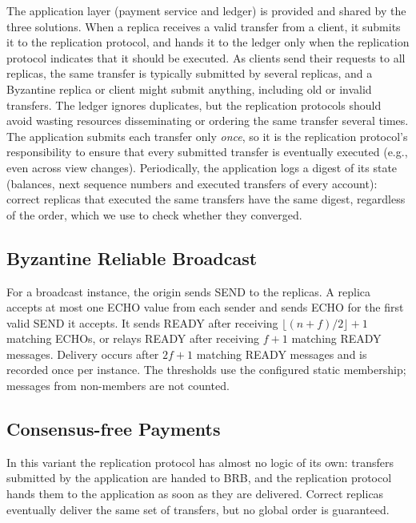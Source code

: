\documentclass[sigconf,a4paper]{acmart}
\begin{document}
    The application layer (payment service and ledger) is provided and shared by
    the three solutions. When a replica receives a valid transfer from a client, it
    submits it to the replication protocol, and hands it to the ledger only when
    the replication protocol indicates that it should be executed. As clients send
    their requests to all replicas, the same transfer is typically submitted by
    several replicas, and a Byzantine replica or client might submit anything,
    including old or invalid transfers. The ledger ignores duplicates, but the
    replication protocols should avoid wasting resources disseminating or ordering
    the same transfer several times. The application submits each transfer only
    \emph{once}, so it is the replication protocol's responsibility to ensure that
    every submitted transfer is eventually executed (e.g., even across view
    changes). Periodically, the application logs a digest of its state (balances,
    next sequence numbers and executed transfers of every account): correct
    replicas that executed the same transfers have the same digest, regardless of
    the order, which we use to check whether they converged.

    \subsection{Byzantine Reliable Broadcast}

    For a broadcast instance, the origin sends SEND to the replicas. A replica
    accepts at most one ECHO value from each sender and sends ECHO for the first
    valid SEND it accepts. It sends READY after receiving
    $\lfloor(n+f)/2\rfloor+1$ matching ECHOs,
    or relays READY after receiving $f+1$ matching READY messages. Delivery
    occurs after $2f+1$ matching READY messages and is recorded once per
    instance. The thresholds use the configured static membership; messages
    from non-members are not counted.

    \subsection{Consensus-free Payments}

    In this variant the replication protocol has almost no logic of its own:
    transfers submitted by the application are handed to BRB, and the replication
    protocol hands them to the application as soon as they are delivered. Correct
    replicas eventually deliver the same set of transfers, but no global order is
    guaranteed.
\end{document}
